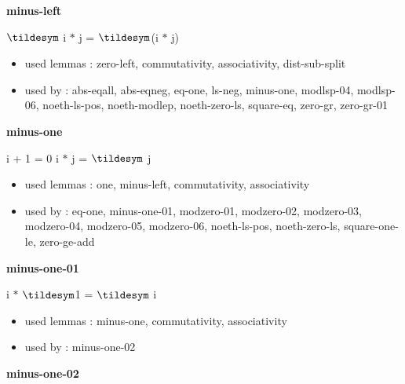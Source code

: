 \documentclass[a4paper]{article}
\begin{document}
\medskip

\bigskip

{\large\bf minus-left}

\medskip

 \Fol $\tildesym$ i $*$ j = $\tildesym$(i $*$ j)

\begin{itemize}


\item       used lemmas  : zero-left, commutativity, associativity, dist-sub-split
\item       used by      : abs-eqall, abs-eqneg, eq-one, ls-neg, minus-one, modlsp-04, modlsp-06, noeth-ls-pos, noeth-modlep, noeth-zero-ls, square-eq, zero-gr, zero-gr-01

\end{itemize}

\medskip

\bigskip

{\large\bf minus-one}

\medskip

 \Fol i + 1 = 0 \Imp i $*$ j = $\tildesym$ j

\begin{itemize}


\item       used lemmas  : one, minus-left, commutativity, associativity
\item       used by      : eq-one, minus-one-01, modzero-01, modzero-02, modzero-03, modzero-04, modzero-05, modzero-06, noeth-ls-pos, noeth-zero-ls, square-one-le, zero-ge-add

\end{itemize}

\medskip

\bigskip

{\large\bf minus-one-01}

\medskip

 \Fol i $*$ $\tildesym$1 = $\tildesym$ i

\begin{itemize}


\item       used lemmas  : minus-one, commutativity, associativity
\item       used by      : minus-one-02

\end{itemize}

\medskip

\bigskip

{\large\bf minus-one-02}
\end{document}
